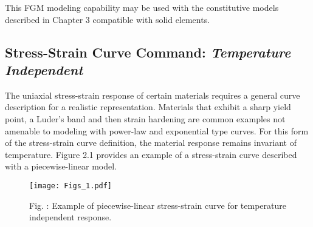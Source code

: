 \documentclass[11pt]{report}
\numberwithin{equation}{section}
\newcommand{\nin} {\noindent}
\newcommand{\ti}{\emph}
\begin{document}
\nin This FGM modeling capability may be used with the constitutive models
described in Chapter 3 compatible with solid elements.

%
\subsection{Stress-Strain Curve Command: \ti{Temperature Independent}}
%
\nin The uniaxial stress-strain response of certain materials requires a
general curve description for a realistic representation. Materials
that exhibit a sharp yield point, a Luder's band and then strain hardening are
common examples not amenable to modeling with power-law and 
exponential type curves. For
this form of the stress-strain curve definition, the material response remains
invariant of temperature. Figure 2.1 provides an example of a stress-strain
curve described with a piecewise-linear model.
%
\begin{figure}[htb]
\begin{center}
\texttt{[image: Figs\_1.pdf]} 
\caption{{\small Fig. \thefigure: Example of piecewise-linear stress-strain curve for temperature 
independent response.\normalsize}
\label{fig:fig1}}
%
\end{center}
\end{figure}
\end{document}
